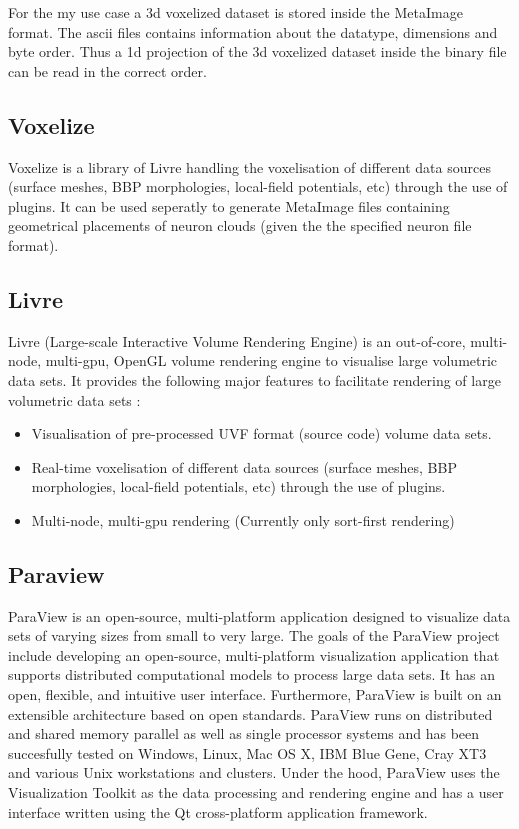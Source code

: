 For the my use case a 3d voxelized dataset is stored inside the MetaImage format.
The ascii files contains information about the datatype, dimensions and byte order.
Thus a 1d projection of the 3d voxelized dataset inside the binary file can be read in the correct order.

\subsection{Voxelize}
\label{sec:voxelize}
Voxelize is a library of Livre handling the voxelisation of different data sources (surface meshes, BBP morphologies, local-field potentials, etc) through the use of plugins.\cite{livre}
It can be used seperatly to generate MetaImage files containing geometrical placements of neuron clouds (given the the specified neuron file format).
\subsection{Livre}
\label{sec:livre}
Livre (Large-scale Interactive Volume Rendering Engine) is an out-of-core, multi-node, multi-gpu, OpenGL volume rendering engine to visualise large volumetric data sets.
It provides the following major features to facilitate rendering of large volumetric data sets \cite{livre}:
\begin{itemize}
    \item Visualisation of pre-processed UVF format (source code) volume data sets.
    \item Real-time voxelisation of different data sources (surface meshes, BBP morphologies, local-field potentials, etc) through the use of plugins.
    \item Multi-node, multi-gpu rendering (Currently only sort-first rendering)
\end{itemize}
\subsection{Paraview}
\label{sec:paraview}
ParaView is an open-source, multi-platform application designed to visualize data sets of varying sizes from small to very large. The goals of the ParaView project include developing an open-source, multi-platform visualization application that supports distributed computational models to process large data sets. It has an open, flexible, and intuitive user interface. Furthermore, ParaView is built on an extensible architecture based on open standards. ParaView runs on distributed and shared memory parallel as well as single processor systems and has been succesfully tested on Windows, Linux, Mac OS X, IBM Blue Gene, Cray XT3 and various Unix workstations and clusters. Under the hood, ParaView uses the Visualization Toolkit as the data processing and rendering engine and has a user interface written using the Qt cross-platform application framework. \cite{paraview}

